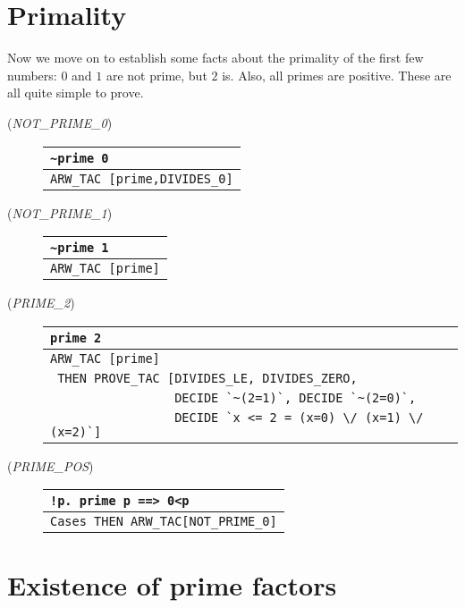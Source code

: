 \section{Primality}

Now we move on to establish some facts about the primality of the
first few numbers: $0$ and $1$ are not prime, but $2$ is. Also, all
primes are positive. These are all quite simple to prove.

\begin{description}

\item [\small{({\it NOT\_PRIME\_0\/})}]
\begin{tabular}[t]{l}
\verb+~prime 0+ \\ \hline
\verb+ARW_TAC [prime,DIVIDES_0]+ \\
\end{tabular}

\item [\small{({\it NOT\_PRIME\_1\/})}]
\begin{tabular}[t]{l}
\verb+~prime 1+ \\ \hline
\verb+ARW_TAC [prime]+ \\
\end{tabular}

\item [\small{({\it PRIME\_2\/})}]
\begin{tabular}[t]{l}
\verb+prime 2+ \\ \hline
\verb+ARW_TAC [prime]+ \\
\verb+ THEN PROVE_TAC [DIVIDES_LE, DIVIDES_ZERO,+ \\
\verb+                 DECIDE `~(2=1)`, DECIDE `~(2=0)`,+ \\
\verb+                 DECIDE `x <= 2 = (x=0) \/ (x=1) \/ (x=2)`]+ \\
\end{tabular}

\item [\small{({\it PRIME\_POS\/})}]
\begin{tabular}[t]{l}
\verb+!p. prime p ==> 0<p+ \\ \hline
\verb+Cases THEN ARW_TAC[NOT_PRIME_0]+ \\
\end{tabular}
\end{description}

\section{Existence of prime factors}

